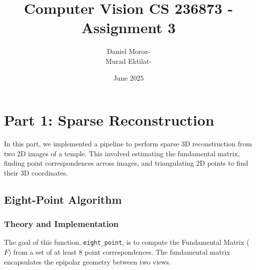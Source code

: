 \documentclass{article}
\title{Computer Vision CS 236873 - Assignment 3}
\author{
    \begin{tabular}{cc}
        Daniel Moroz  & -  \\
        Murad Ektilat & - \\
    \end{tabular}}
\date{June 2025}
\begin{document}
\maketitle

\section{Part 1: Sparse Reconstruction}
In this part, we implemented a pipeline to perform sparse 3D reconstruction from two 2D images of a temple. This involved estimating the fundamental matrix, finding point correspondences across images, and triangulating 2D points to find their 3D coordinates.

\subsection{Eight-Point Algorithm}
\subsubsection{Theory and Implementation}
The goal of this function, \texttt{eight\_point}, is to compute the Fundamental Matrix ($F$) from a set of at least 8 point correspondences. The fundamental matrix encapsulates the epipolar geometry between two views.
\end{document}
